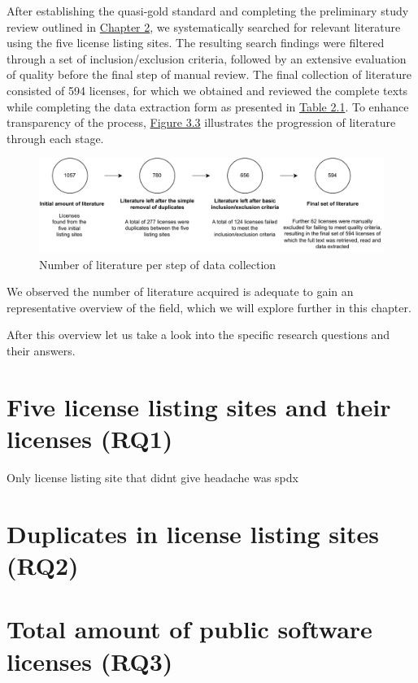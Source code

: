 After establishing the quasi-gold standard and completing the preliminary study review outlined in \hyperref[methods]{Chapter 2}, we systematically searched for relevant literature using the five license listing sites. The resulting search findings were filtered through a set of inclusion/exclusion criteria, followed by an extensive evaluation of quality before the final step of manual review. The final collection of literature consisted of 594 licenses, for which we obtained and reviewed the complete texts while completing the data extraction form as presented in \hyperref[table:extraction]{Table 2.1}. To enhance transparency of the process, \hyperref[fig:3-3]{Figure 3.3} illustrates the progression of literature through each stage.
\begin{figure}
	\centering
	\includegraphics[scale=0.8]{figures/figure-3-3.pdf}
	\caption{Number of literature per step of data collection}
	\label{fig:3-3}
\end{figure}
We observed the number of literature acquired is adequate to gain an representative overview of the field, which we will explore further in this chapter.

After this overview let us take a look into the specific research questions and their answers.

\section{Five license listing sites and their licenses (RQ1)}

Only license listing site that didnt give headache was spdx
\section{Duplicates in license listing sites (RQ2)}
\section{Total amount of public software licenses (RQ3)}

